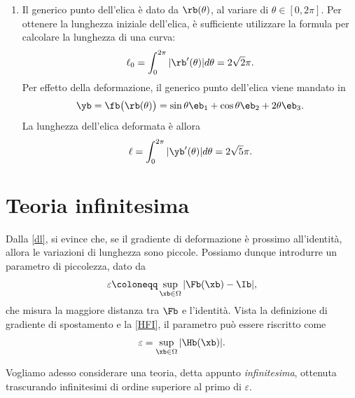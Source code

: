 \begin{exercise}
\begin{svolgimento}
\begin{enumerate}
			\item Il generico punto  dell'elica è dato da $\rb(\theta)$, al variare di $\theta\in[0,2\pi]$. Per ottenere la lunghezza iniziale dell'elica, è sufficiente utilizzare la formula per calcolare la lunghezza di una curva:
			\begin{equation}
				\ell_0=\int_0^{2\pi}|\rb'(\theta)|d\theta=2\sqrt{2}\pi.
			\end{equation}
			Per effetto della deformazione, il generico punto  dell'elica viene mandato in
			\begin{equation}
				\yb=\fb\big(\rb(\theta)\big)=\sin\theta\eb_1+\cos\theta\eb_2+2\theta\eb_3.
			\end{equation}
			La lunghezza dell'elica deformata è allora
			\begin{equation}
				\ell=\int_0^{2\pi}|\yb'(\theta)|d\theta=2\sqrt{5}\pi.
			\end{equation}
		\end{enumerate}
	\end{svolgimento}
	
\end{exercise}



\section{Teoria infinitesima}


Dalla \eqref{dl}, si evince che, se il gradiente di deformazione è prossimo all'identità, allora le variazioni di lunghezza sono piccole. Possiamo dunque introdurre un parametro di piccolezza, dato da
\begin{equation}
	\varepsilon\coloneqq\sup_{\xb\in\Omega}|\Fb(\xb)-\Ib|,
\end{equation}
che misura la maggiore distanza tra $\Fb$ e l'identità. Vista la definizione di gradiente di spostamento e la \eqref{HFI}, il parametro può essere riscritto come
\begin{equation}\label{eps}
\varepsilon=\sup_{\xb\in\Omega}|\Hb(\xb)|.
\end{equation}

Vogliamo adesso considerare una teoria, detta appunto \textit{infinitesima}, ottenuta trascurando infinitesimi di ordine superiore al primo di $\varepsilon$.

